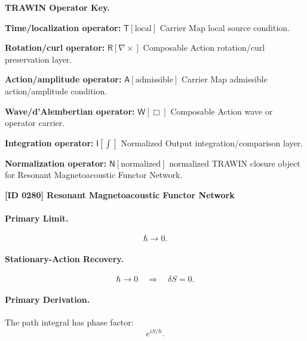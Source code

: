 \par\vspace{0.45\baselineskip}
\noindent\begin{minipage}[t]{\linewidth}
\begingroup
\small
\raggedright
\textbf{TRAWIN Operator Key.}\par
\noindent\textbf{Time/localization operator:} $\mathsf{T}\!\left[\mathrm{local}\right]$ Carrier Map local source condition.\par
\noindent\textbf{Rotation/curl operator:} $\mathsf{R}\!\left[\nabla\times\right]$ Composable Action rotation/curl preservation layer.\par
\noindent\textbf{Action/amplitude operator:} $\mathsf{A}\!\left[\mathrm{admissible}\right]$ Carrier Map admissible action/amplitude condition.\par
\noindent\textbf{Wave/d'Alembertian operator:} $\mathsf{W}\!\left[\Box\right]$ Composable Action wave or operator carrier.\par
\noindent\textbf{Integration operator:} $\mathsf{I}\!\left[\int\right]$ Normalized Output integration/comparison layer.\par
\noindent\textbf{Normalization operator:} $\mathsf{N}\!\left[\mathrm{normalized}\right]$ normalized TRAWIN closure object for Resonant Magnetoacoustic Functor Network.\par
\endgroup
\end{minipage}

\clearpage
\noindent\textbf{[ID 0280] Resonant Magnetoacoustic Functor Network}\par
\vspace{0.35em}
\paragraph{Primary Limit.}
\begin{equation}
\hbar\rightarrow 0 .
\end{equation}

\paragraph{Stationary-Action Recovery.}
\begin{equation}
\hbar\rightarrow 0
\quad\Longrightarrow\quad
\delta S=0 .
\end{equation}

\paragraph{Primary Derivation.}
The path integral has phase factor:
\begin{equation}
e^{iS/\hbar}.
\end{equation}

